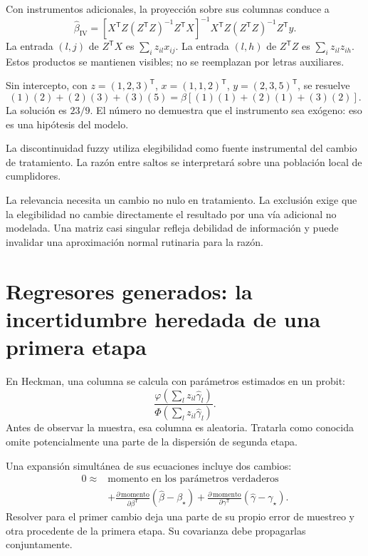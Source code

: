 \documentclass[11pt,a4paper]{article}
\newcommand{\T}{^{\mathsf T}}
\begin{document}
Con instrumentos adicionales, la proyección
sobre sus columnas conduce a
\[
\widehat\beta_{\mathrm{IV}}
=\left[X\T Z(Z\T Z)^{-1}Z\T X\right]^{-1}
X\T Z(Z\T Z)^{-1}Z\T y.
\]
La entrada \((l,j)\) de \(Z\T X\) es
\(\sum_i z_{il}x_{ij}\).
La entrada \((l,h)\) de \(Z\T Z\) es
\(\sum_i z_{il}z_{ih}\).
Estos productos se mantienen visibles;
no se reemplazan por letras auxiliares.

\begin{ejemplo}
Sin intercepto, con \(z=(1,2,3)\T\),
\(x=(1,1,2)\T\), \(y=(2,3,5)\T\), se resuelve
\[
(1)(2)+(2)(3)+(3)(5)
=\beta[(1)(1)+(2)(1)+(3)(2)].
\]
La solución es \(23/9\).
El número no demuestra que el instrumento
sea exógeno: eso es una hipótesis del modelo.
\end{ejemplo}
La discontinuidad fuzzy utiliza elegibilidad
como fuente instrumental del cambio de tratamiento.
La razón entre saltos se interpretará
sobre una población local de cumplidores.

La relevancia necesita un cambio no nulo
en tratamiento. La exclusión exige que la
elegibilidad no cambie directamente el resultado
por una vía adicional no modelada.
Una matriz casi singular refleja debilidad
de información y puede invalidar una
aproximación normal rutinaria para la razón.

\clearpage
\section{Regresores generados: la incertidumbre heredada de una primera etapa}\label{unidad17}
En Heckman, una columna se calcula con parámetros
estimados en un probit:
\[
\frac{\varphi(\sum_l z_{il}\widehat\gamma_l)}
{\Phi(\sum_l z_{il}\widehat\gamma_l)}.
\]
Antes de observar la muestra, esa columna es aleatoria.
Tratarla como conocida omite potencialmente
una parte de la dispersión de segunda etapa.

Una expansión simultánea de sus ecuaciones
incluye dos cambios:
\[
\begin{aligned}
0\approx&
\text{momento en los parámetros verdaderos}\\
&+\frac{\partial\,\text{momento}}{\partial\beta\T}
(\widehat\beta-\beta_\star)
+\frac{\partial\,\text{momento}}{\partial\gamma\T}
(\widehat\gamma-\gamma_\star).
\end{aligned}
\]
Resolver para el primer cambio deja
una parte de su propio error de muestreo
y otra procedente de la primera etapa.
Su covarianza debe propagarlas conjuntamente.
\end{document}
